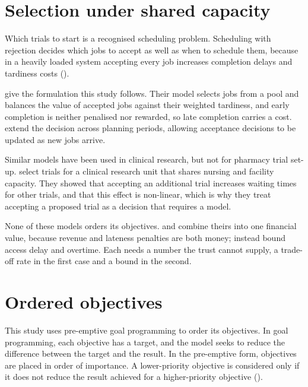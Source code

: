 \section{Selection under shared capacity}
\label{sec:selection}

Which trials to start is a recognised scheduling problem. Scheduling with rejection decides which jobs to accept as well as when to schedule them, because in a heavily loaded system accepting every job increases completion delays and tardiness costs (\citealp{Shabtay2013Rejection}).

\citet{SlotnickMorton2007OrderAcceptance} give the formulation this study follows. Their model selects jobs from a pool and balances the value of accepted jobs against their weighted tardiness, and early completion is neither penalised nor rewarded, so late completion carries a cost. \citet{LewisSlotnick2002MultiPeriod} extend the decision across planning periods, allowing acceptance decisions to be updated as new jobs arrive.

Similar models have been used in clinical research, but not for pharmacy trial set-up. \citet{DegliseHawkinson2020CAPTAIN} select trials for a clinical research unit that shares nursing and facility capacity. They showed that accepting an additional trial increases waiting times for other trials, and that this effect is non-linear, which is why they treat accepting a proposed trial as a decision that requires a model.

None of these models orders its objectives. \citet{SlotnickMorton2007OrderAcceptance} and \citet{LewisSlotnick2002MultiPeriod} combine theirs into one financial value, because revenue and lateness penalties are both money; \citet{DegliseHawkinson2020CAPTAIN} instead bound access delay and overtime. Each needs a number the trust cannot supply, a trade-off rate in the first case and a bound in the second.

\section{Ordered objectives}
\label{sec:ordered}

This study uses pre-emptive goal programming to order its objectives. In goal programming, each objective has a target, and the model seeks to reduce the difference between the target and the result. In the pre-emptive form, objectives are placed in order of importance. A lower-priority objective is considered only if it does not reduce the result achieved for a higher-priority objective (\citealp{JonesTamiz2010GoalProgramming}).

